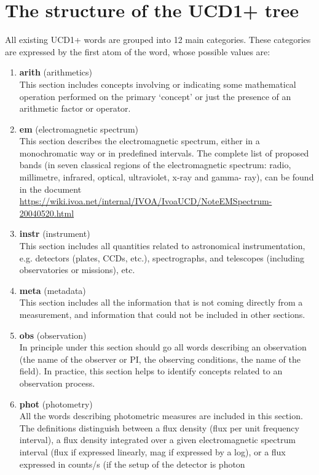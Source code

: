 \documentclass[11pt,a4paper]{ivoa}
\begin{document}
\section{The structure of the UCD1+ tree}
All existing UCD1+ words are grouped into 12 main categories. These categories are expressed by the 
first atom of the word, whose possible values are:
\begin{enumerate}
\item {\bf arith} (arithmetics)\\ This section includes concepts involving or indicating some 
mathematical operation performed on the primary `concept' or just the presence of an arithmetic 
factor or operator.
\item {\bf em} (electromagnetic spectrum)\\ This section describes the electromagnetic spectrum, 
either in a monochromatic way or in predefined intervals. The complete list of proposed bands (in 
seven classical regions of the electromagnetic spectrum: radio, millimetre, infrared, optical, 
ultraviolet, x-ray and gamma- ray), can be found in the document 
\url{https://wiki.ivoa.net/internal/IVOA/IvoaUCD/NoteEMSpectrum-20040520.html}
\item {\bf instr} (instrument)\\ This section includes all quantities related to astronomical 
instrumentation, e.g. detectors (plates, CCDs, etc.), spectrographs, and telescopes (including 
observatories or missions), etc.
\item {\bf meta} (metadata)\\ This section includes all the information that is not coming directly 
from a measurement, and information that could not be included in other sections.
\item {\bf obs} (observation)\\ In principle under this section should go all words describing an 
observation (the name of the observer or PI, the observing conditions, the name of the field). In 
practice, this section helps to identify concepts related to an observation process.
\item {\bf phot} (photometry)\\ All the words describing photometric measures are included in this 
section. The definitions distinguish between a flux density (flux per unit frequency interval), a 
flux density integrated over a given electromagnetic spectrum interval (flux if expressed linearly, 
mag if expressed by a log), or a flux expressed in counts/s (if the setup of the detector is photon 

\end{enumerate}
\end{document}
